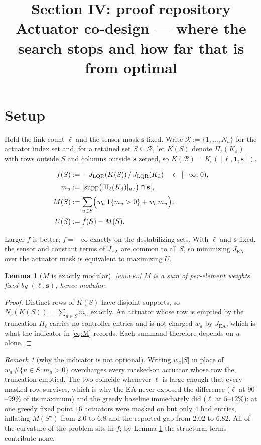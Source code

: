 \documentclass[11pt]{article}
\title{Section IV: proof repository\\[2pt]
\large Actuator co-design --- where the search stops and how far that is from optimal}
\author{}
\date{}
\newtheorem{lemma}[theorem]{Lemma}
\theoremstyle{definition}
\theoremstyle{remark}
\newtheorem{remark}[theorem]{Remark}
\newcommand{\JEA}{J_{\mathrm{EA}}}
\newcommand{\JLQR}{J_{\mathrm{LQR}}}
\newcommand{\Kd}{K_{\mathrm{d}}}
\newcommand{\Ks}{K_{\mathrm{s}}}
\newcommand{\Rset}{\mathcal{R}}
\newcommand{\Sstar}{S^{\star}}
\newcommand{\tagged}[1]{\textsc{[#1]}}
\begin{document}
\maketitle
\vspace{-2.5em}

\section{Setup}

Hold the link count $\ell$ and the sensor mask $\mathbf{s}$ fixed. Write
$\Rset := \{1,\dots,N_u\}$ for the actuator index set and, for a retained set
$S \subseteq \Rset$, let $K(S)$ denote $\Pi_\ell(\Kd)$ with rows outside $S$ and
columns outside $\mathbf{s}$ zeroed, so $K(\Rset) = \Ks([\ell,\mathbf{1},\mathbf{s}])$.

\begin{align}
  f(S) &:= -\,\JLQR(K(S))\,/\,\JLQR(\Kd)
    \quad\in\ [-\infty,\,0),
    \label{eq:f}\\[2pt]
  m_u &:= \bigl|\operatorname{supp}\bigl([\Pi_\ell(\Kd)]_{u,:}\bigr) \cap \mathbf{s}\bigr|,
    \label{eq:mu}\\[2pt]
  M(S) &:= \sum_{u \in S}\Bigl( w_a\,\mathbf{1}\{m_u > 0\} + w_c\,m_u \Bigr),
    \label{eq:M}\\[2pt]
  U(S) &:= f(S) - M(S).
    \label{eq:U}
\end{align}

Larger $f$ is better; $f = -\infty$ exactly on the destabilizing sets. With
$\ell$ and $\mathbf{s}$ fixed, the sensor and constant terms of $\JEA$ are common
to all $S$, so minimizing $\JEA$ over the actuator mask is equivalent to
maximizing $U$.

\begin{lemma}[$M$ is exactly modular]\label{lem:modular} \tagged{proved}
$M$ is a sum of per-element weights fixed by $(\ell,\mathbf{s})$, hence modular.
\end{lemma}

\begin{proof}
Distinct rows of $K(S)$ have disjoint supports, so $N_c(K(S)) = \sum_{u\in S} m_u$
exactly. An actuator whose row is emptied by the truncation $\Pi_\ell$ carries no
controller entries and is not charged $w_a$ by $\JEA$, which is what the indicator
in \eqref{eq:M} records. Each summand therefore depends on $u$ alone.
\end{proof}

\begin{remark}[why the indicator is not optional]
Writing $w_a|S|$ in place of $w_a\,\#\{u \in S : m_u > 0\}$ overcharges every
masked-on actuator whose row the truncation emptied. The two coincide whenever
$\ell$ is large enough that every masked row survives, which is why the EA never
exposed the difference ($\ell$ at $90$--$99\%$ of its maximum) and the greedy
baseline immediately did ($\ell$ at $5$--$12\%$): at one greedy fixed point $16$
actuators were masked on but only $4$ had entries, inflating $M(\Sstar)$ from
$2.0$ to $6.8$ and the reported gap from $2.02$ to $6.82$. All of the curvature of
the problem sits in $f$; by Lemma \ref{lem:modular} the structural terms
contribute none.
\end{remark}
\end{document}
